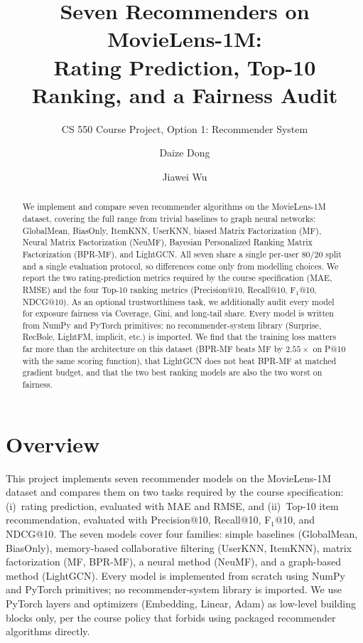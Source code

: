 \documentclass[sigconf,nonacm]{acmart}
\begin{document}
\title{Seven Recommenders on MovieLens-1M: \\ Rating Prediction, Top-10 Ranking, and a Fairness Audit}
\subtitle{CS 550 Course Project, Option 1: Recommender System}

\author{Daize Dong}

\author{Jiawei Wu}

\begin{abstract}
We implement and compare seven recommender algorithms on the MovieLens-1M
dataset, covering the full range from trivial baselines to graph neural
networks: GlobalMean, BiasOnly, ItemKNN, UserKNN, biased Matrix Factorization
(MF), Neural Matrix Factorization (NeuMF), Bayesian Personalized Ranking
Matrix Factorization (BPR-MF), and LightGCN. All seven share a single
per-user 80/20 split and a single evaluation protocol, so differences come
only from modelling choices. We report the two rating-prediction metrics
required by the course specification (MAE, RMSE) and the four Top-10
ranking metrics (Precision@10, Recall@10, F$_1$@10, NDCG@10). As an
optional trustworthiness task, we additionally audit every model for
exposure fairness via Coverage, Gini, and long-tail share. Every model is
written from NumPy and PyTorch primitives; no recommender-system library
(Surprise, RecBole, LightFM, implicit, etc.) is imported. We find that the
training loss matters far more than the architecture on this dataset
(BPR-MF beats MF by $2.55\times$ on P@10 with the same scoring function),
that LightGCN does not beat BPR-MF at matched gradient budget, and that the
two best ranking models are also the two worst on fairness.
\end{abstract}

\maketitle

\section{Overview}
This project implements seven recommender models on the MovieLens-1M
dataset and compares them on two tasks required by the course
specification: (i)~rating prediction, evaluated with MAE and RMSE,
and (ii)~Top-10 item recommendation, evaluated with Precision@10,
Recall@10, F$_1$@10, and NDCG@10. The seven models cover four
families: simple baselines (GlobalMean, BiasOnly), memory-based
collaborative filtering (UserKNN, ItemKNN), matrix factorization
(MF, BPR-MF), a neural method (NeuMF), and a graph-based method
(LightGCN). Every model is implemented from scratch using NumPy and
PyTorch primitives; no recommender-system library is imported. We
use PyTorch layers and optimizers (Embedding, Linear, Adam) as
low-level building blocks only, per the course policy that forbids
using packaged recommender algorithms directly.
\end{document}
